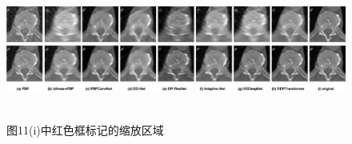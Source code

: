 \begin{figure}
	\centering
	\includegraphics[height=4.67cm,width=18cm]{17.eps}
	\caption{图11(i)中红色框标记的缩放区域}
	\label{fig13}
\end{figure}







